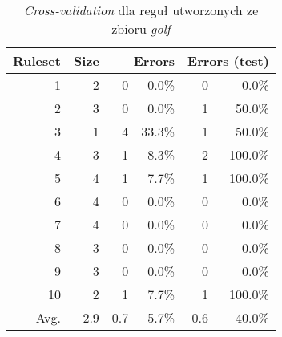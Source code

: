 \begin{table}
\begin{tabular}{|r|r|rr|rr|}
\hline
 Ruleset & 
 Size & 
 \multicolumn{2}{1|}{Errors} & 
 \multicolumn{2}{1|}{Errors (test)} \\
\hline\hline
       1 &    2 &    0 &  0.0\%  &    0 &   0.0\% \\
       2 &    3 &    0 &  0.0\%  &    1 &  50.0\% \\
       3 &    1 &    4 & 33.3\%  &    1 &  50.0\% \\
       4 &    3 &    1 &  8.3\%  &    2 & 100.0\% \\
       5 &    4 &    1 &  7.7\%  &    1 & 100.0\% \\
       6 &    4 &    0 &  0.0\%  &    0 &   0.0\% \\
       7 &    4 &    0 &  0.0\%  &    0 &   0.0\% \\
       8 &    3 &    0 &  0.0\%  &    0 &   0.0\% \\
       9 &    3 &    0 &  0.0\%  &    0 &   0.0\% \\
      10 &    2 &    1 &  7.7\%  &    1 & 100.0\% \\
\hline\hline
    Avg. &  2.9 &  0.7 &  5.7\%  &  0.6 &  40.0\% \\
\hline
\end{tabular}
\caption{\emph{Cross-validation} dla reguł utworzonych ze zbioru \emph{golf}}
\label{p2t2-golf-rules-cv}
\end{table}
